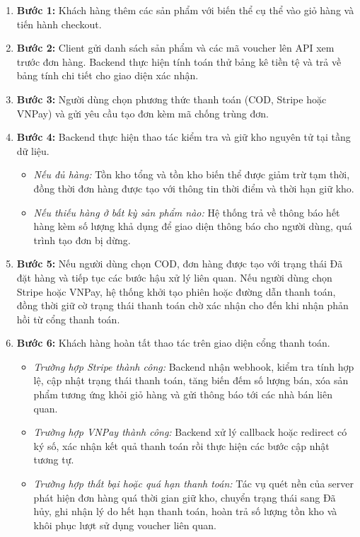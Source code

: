 \documentclass[../DoAn.tex]{subfiles}
\begin{document}
\begin{enumerate}
    \item \textbf{Bước 1:} Khách hàng thêm các sản phẩm với biến thể cụ thể vào giỏ hàng và tiến hành checkout.
    \item \textbf{Bước 2:} Client gửi danh sách sản phẩm và các mã voucher lên API xem trước đơn hàng. Backend thực hiện tính toán thử bảng kê tiền tệ và trả về bảng tính chi tiết cho giao diện xác nhận.
    \item \textbf{Bước 3:} Người dùng chọn phương thức thanh toán (COD, Stripe hoặc VNPay) và gửi yêu cầu tạo đơn kèm mã chống trùng đơn.
    \item \textbf{Bước 4:} Backend thực hiện thao tác kiểm tra và giữ kho nguyên tử tại tầng dữ liệu.
    \begin{itemize}
        \item \textit{Nếu đủ hàng:} Tồn kho tổng và tồn kho biến thể được giảm trừ tạm thời, đồng thời đơn hàng được tạo với thông tin thời điểm và thời hạn giữ kho.
        \item \textit{Nếu thiếu hàng ở bất kỳ sản phẩm nào:} Hệ thống trả về thông báo hết hàng kèm số lượng khả dụng để giao diện thông báo cho người dùng, quá trình tạo đơn bị dừng.
    \end{itemize}
    \item \textbf{Bước 5:} Nếu người dùng chọn COD, đơn hàng được tạo với trạng thái Đã đặt hàng và tiếp tục các bước hậu xử lý liên quan. Nếu người dùng chọn Stripe hoặc VNPay, hệ thống khởi tạo phiên hoặc đường dẫn thanh toán, đồng thời giữ cờ trạng thái thanh toán chờ xác nhận cho đến khi nhận phản hồi từ cổng thanh toán.
    \item \textbf{Bước 6:} Khách hàng hoàn tất thao tác trên giao diện cổng thanh toán.
    \begin{itemize}
        \item \textit{Trường hợp Stripe thành công:} Backend nhận webhook, kiểm tra tính hợp lệ, cập nhật trạng thái thanh toán, tăng biến đếm số lượng bán, xóa sản phẩm tương ứng khỏi giỏ hàng và gửi thông báo tới các nhà bán liên quan.
        \item \textit{Trường hợp VNPay thành công:} Backend xử lý callback hoặc redirect có ký số, xác nhận kết quả thanh toán rồi thực hiện các bước cập nhật tương tự.
        \item \textit{Trường hợp thất bại hoặc quá hạn thanh toán:} Tác vụ quét nền của server phát hiện đơn hàng quá thời gian giữ kho, chuyển trạng thái sang Đã hủy, ghi nhận lý do hết hạn thanh toán, hoàn trả số lượng tồn kho và khôi phục lượt sử dụng voucher liên quan.
    \end{itemize}
\end{enumerate}
\end{document}
